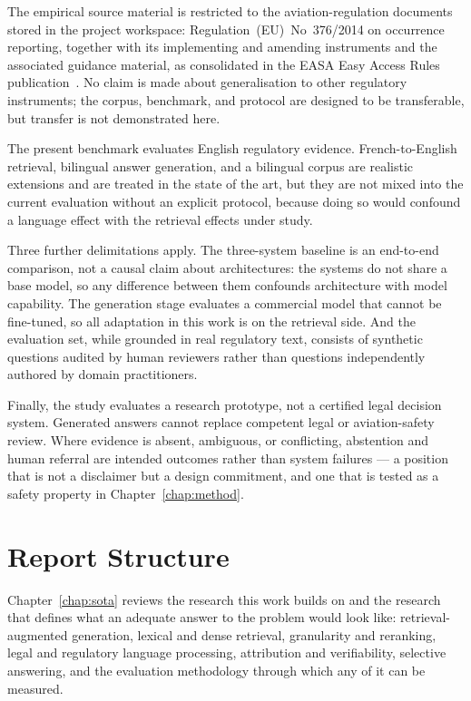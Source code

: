 The empirical source material is restricted to the aviation-regulation documents stored in the project workspace: Regulation~(EU)~No~376/2014 on occurrence reporting, together with its implementing and amending instruments and the associated guidance material, as consolidated in the \ac{EASA} Easy Access Rules publication~\cite{eu2014reg376,easa2022easyaccess376}. No claim is made about generalisation to other regulatory instruments; the corpus, benchmark, and protocol are designed to be transferable, but transfer is not demonstrated here.

The present benchmark evaluates English regulatory evidence. French-to-English retrieval, bilingual answer generation, and a bilingual corpus are realistic extensions and are treated in the state of the art, but they are not mixed into the current evaluation without an explicit protocol, because doing so would confound a language effect with the retrieval effects under study.

Three further delimitations apply. The three-system baseline is an end-to-end comparison, not a causal claim about architectures: the systems do not share a base model, so any difference between them confounds architecture with model capability. The generation stage evaluates a commercial model that cannot be fine-tuned, so all adaptation in this work is on the retrieval side. And the evaluation set, while grounded in real regulatory text, consists of synthetic questions audited by human reviewers rather than questions independently authored by domain practitioners.

Finally, the study evaluates a research prototype, not a certified legal decision system. Generated answers cannot replace competent legal or aviation-safety review. Where evidence is absent, ambiguous, or conflicting, abstention and human referral are intended outcomes rather than system failures --- a position that is not a disclaimer but a design commitment, and one that is tested as a safety property in Chapter~\ref{chap:method}.

\section{Report Structure}
\label{sec:intro-structure}

Chapter~\ref{chap:sota} reviews the research this work builds on and the research that defines what an adequate answer to the problem would look like: retrieval-augmented generation, lexical and dense retrieval, granularity and reranking, legal and regulatory language processing, attribution and verifiability, selective answering, and the evaluation methodology through which any of it can be measured.

